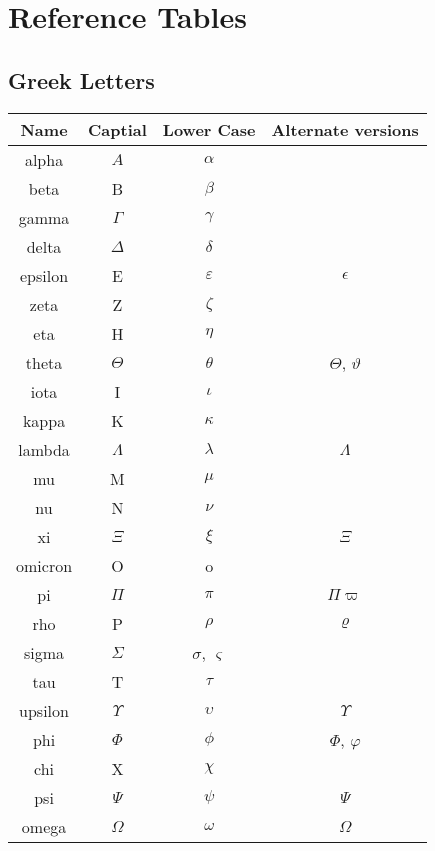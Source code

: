 


\chapter{Reference Tables}
\section{Greek Letters}
\begin{longtable}{| c  | c | c | c |}
	\hline
	\textbf{Name} & \textbf{Captial} & \textbf{Lower Case} & \textbf{Alternate versions} \\
	\hline
	alpha	& $ A $ & $\alpha$ & \\
	\hline
	beta & B & $\beta$  & \\
	\hline
	gamma & $\Gamma $ & $\gamma$ & \\
	\hline
	delta & $\Delta$ & $ \delta $ & \\
	\hline
	epsilon & E & $\varepsilon $ & $\epsilon $\\
	\hline
	zeta & Z & $\zeta $ & \\
	\hline
	eta & H & $\eta$ & \\
	\hline
	theta & $\Theta$ & $\theta$ & $\varTheta$, $\vartheta$\\
	\hline
	iota & I & $\iota$ &  \\
	\hline
	kappa & K& $\kappa$ & \\
	\hline
	lambda & $\Lambda $ & $\lambda$ & $\varLambda$ \\
	\hline
	mu & M & $\mu$ & \\
	\hline
	nu & N & $\nu$ & \\
	\hline
	xi & $\Xi$ & $\xi$ & $\varXi $ \\
	\hline
	omicron & O & o & \\
	\hline
	pi & $\Pi$ & $\pi$ & $\varPi \varpi$ \\
	\hline
	rho & P & $\rho$ & $\varrho$ \\
	\hline
	sigma & $\Sigma$ & $\sigma$, $\varsigma$ & \\ 
	\hline
	tau & T & $\tau$ & \\
	\hline
	upsilon & $\Upsilon$ & $\upsilon$ & $\varUpsilon$\\
	\hline
	phi & $\Phi$ & $\phi$ & $\varPhi$, $\varphi$ \\
	\hline
	chi & X & $\chi$ &  \\
	\hline
	psi & $\Psi$ & $\psi$ &  $ \varPsi$\\
	\hline
	omega & $\Omega$ & $\omega$ & $\varOmega $ \\
	\hline
\end{longtable}

